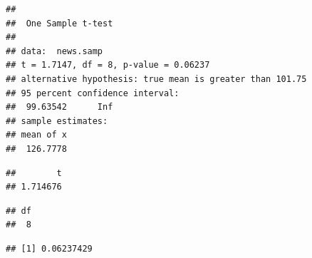 \documentclass[
]{book}
\newenvironment{Shaded}{\begin{snugshade}}{\end{snugshade}}
\newcommand{\AttributeTok}[1]{\textcolor[rgb]{0.13,0.29,0.53}{#1}}
\newcommand{\DocumentationTok}[1]{\textcolor[rgb]{0.56,0.35,0.01}{\textbf{\textit{#1}}}}
\newcommand{\FloatTok}[1]{\textcolor[rgb]{0.00,0.00,0.81}{#1}}
\newcommand{\FunctionTok}[1]{\textcolor[rgb]{0.13,0.29,0.53}{\textbf{#1}}}
\newcommand{\NormalTok}[1]{#1}
\newcommand{\OtherTok}[1]{\textcolor[rgb]{0.56,0.35,0.01}{#1}}
\newcommand{\SpecialCharTok}[1]{\textcolor[rgb]{0.81,0.36,0.00}{\textbf{#1}}}
\newcommand{\StringTok}[1]{\textcolor[rgb]{0.31,0.60,0.02}{#1}}
\theoremstyle{definition}
\theoremstyle{definition}
\theoremstyle{definition}
\theoremstyle{definition}
\theoremstyle{remark}
\begin{document}
\begin{verbatim}
## 
##  One Sample t-test
## 
## data:  news.samp
## t = 1.7147, df = 8, p-value = 0.06237
## alternative hypothesis: true mean is greater than 101.75
## 95 percent confidence interval:
##  99.63542      Inf
## sample estimates:
## mean of x 
##  126.7778
\end{verbatim}

\begin{Shaded}
\end{Shaded}

\begin{verbatim}
##        t 
## 1.714676
\end{verbatim}

\begin{Shaded}
\end{Shaded}

\begin{verbatim}
## df 
##  8
\end{verbatim}

\begin{Shaded}
\end{Shaded}

\begin{verbatim}
## [1] 0.06237429
\end{verbatim}

\begin{Shaded}
\end{Shaded}
\end{document}
